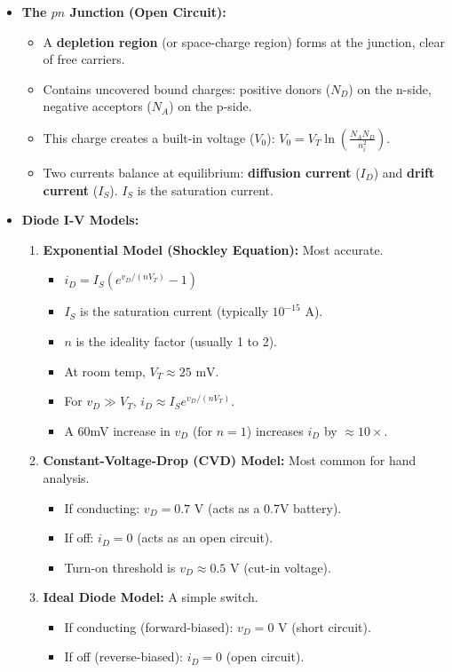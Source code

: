 \documentclass[12pt, letterpaper]{article}
\begin{document}
\begin{itemize}
    \item \textbf{The $pn$ Junction (Open Circuit):}
    \begin{itemize}
        \item A \textbf{depletion region} (or space-charge region) forms at the junction, clear of free carriers.
        \item Contains uncovered bound charges: positive donors ($N_D$) on the n-side, negative acceptors ($N_A$) on the p-side.
        \item This charge creates a built-in voltage ($V_0$): $V_0 = V_T \ln\left(\frac{N_A N_D}{n_i^2}\right)$.
        \item Two currents balance at equilibrium: \textbf{diffusion current} ($I_D$) and \textbf{drift current} ($I_S$). $I_S$ is the saturation current.
    \end{itemize}
    
    \item \textbf{Diode I-V Models:}
    \begin{enumerate}
        \item \textbf{Exponential Model (Shockley Equation):} Most accurate.
        \begin{itemize}
            \item $i_D = I_S (e^{v_D / (nV_T)} - 1)$
            \item $I_S$ is the saturation current (typically $10^{-15}$ A).
            \item $n$ is the ideality factor (usually 1 to 2).
            \item At room temp, $V_T \approx 25 \text{ mV}$.
            \item For $v_D \gg V_T$, $i_D \approx I_S e^{v_D / (nV_T)}$.
            \item A 60mV increase in $v_D$ (for $n=1$) increases $i_D$ by $\approx 10\times$.
        \end{itemize}
        \item \textbf{Constant-Voltage-Drop (CVD) Model:} Most common for hand analysis.
        \begin{itemize}
            \item If conducting: $v_D = 0.7 \text{ V}$ (acts as a 0.7V battery).
            \item If off: $i_D = 0$ (acts as an open circuit).
            \item Turn-on threshold is $v_D \approx 0.5 \text{ V}$ (cut-in voltage).
        \end{itemize}
        \item \textbf{Ideal Diode Model:} A simple switch.
        \begin{itemize}
            \item If conducting (forward-biased): $v_D = 0 \text{ V}$ (short circuit).
            \item If off (reverse-biased): $i_D = 0$ (open circuit).
        \end{itemize}
    \end{enumerate}
    

\end{itemize}
\end{document}
